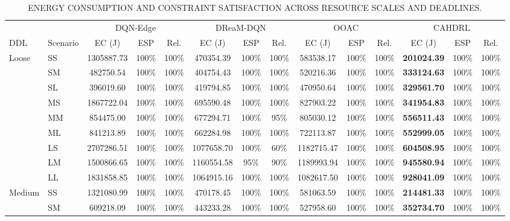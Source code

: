 \documentclass[journal]{IEEEtran}
\begin{document}
\begin{table}[!t]
\centering
\caption{ENERGY CONSUMPTION AND CONSTRAINT SATISFACTION ACROSS RESOURCE SCALES AND DEADLINES.}
\label{tab:constraint_results}
\scriptsize
\setlength{\tabcolsep}{3pt}
\renewcommand{\arraystretch}{1.05}
\begin{tabular*}{\textwidth}{@{\extracolsep{\fill}}ll*{4}{ccc}@{}}
\toprule
& & \multicolumn{3}{c}{DQN-Edge}
& \multicolumn{3}{c}{DReaM-DQN}
& \multicolumn{3}{c}{OOAC}
& \multicolumn{3}{c}{CAHDRL} \\
\cmidrule(lr){3-5}
\cmidrule(lr){6-8}
\cmidrule(lr){9-11}
\cmidrule(l){12-14}
DDL & Scenario
& EC (J) & ESP & Rel.
& EC (J) & ESP & Rel.
& EC (J) & ESP & Rel.
& EC (J) & ESP & Rel. \\
\midrule
Loose & SS & 1305887.73 & 100\% & 100\% & 470354.39 & 100\% & 100\% & 583538.17 & 100\% & 100\% & \textbf{201024.39} & 100\% & 100\% \\
 & SM & 482750.54 & 100\% & 100\% & 404754.43 & 100\% & 100\% & 520216.36 & 100\% & 100\% & \textbf{333124.63} & 100\% & 100\% \\
 & SL & 396019.60 & 100\% & 100\% & 419794.85 & 100\% & 100\% & 470950.64 & 100\% & 100\% & \textbf{329561.70} & 100\% & 100\% \\
 & MS & 1867722.04 & 100\% & 100\% & 695590.48 & 100\% & 100\% & 827903.22 & 100\% & 100\% & \textbf{341954.83} & 100\% & 100\% \\
 & MM & 854475.00 & 100\% & 100\% & 677294.71 & 100\% & 95\% & 805030.12 & 100\% & 100\% & \textbf{556511.43} & 100\% & 100\% \\
 & ML & 841213.89 & 100\% & 100\% & 662284.98 & 100\% & 100\% & 722113.87 & 100\% & 100\% & \textbf{552999.05} & 100\% & 100\% \\
 & LS & 2707286.51 & 100\% & 100\% & 1077658.70 & 100\% & 60\% & 1182715.47 & 100\% & 100\% & \textbf{604508.95} & 100\% & 100\% \\
 & LM & 1500866.65 & 100\% & 100\% & 1160554.58 & 95\% & 90\% & 1189993.94 & 100\% & 100\% & \textbf{945580.94} & 100\% & 100\% \\
 & LL & 1831858.85 & 100\% & 100\% & 1064915.16 & 100\% & 100\% & 1082617.50 & 100\% & 100\% & \textbf{928041.09} & 100\% & 100\% \\
\midrule
Medium & SS & 1321080.99 & 100\% & 100\% & 470178.45 & 100\% & 100\% & 581063.59 & 100\% & 100\% & \textbf{214481.33} & 100\% & 100\% \\
 & SM & 609218.09 & 100\% & 100\% & 443233.28 & 100\% & 100\% & 527958.60 & 100\% & 100\% & \textbf{352734.70} & 100\% & 100\% \\

\end{tabular*}
\end{table}
\end{document}
